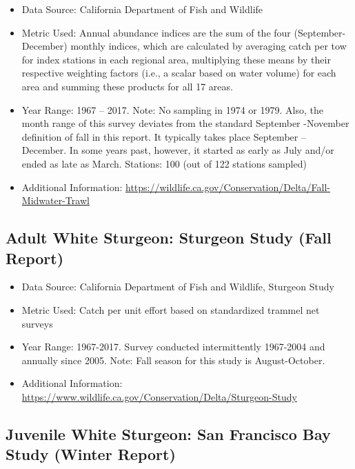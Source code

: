 \documentclass[
]{book}
\providecommand{\tightlist}{%
  \setlength{\itemsep}{0pt}\setlength{\parskip}{0pt}}
\begin{document}
\begin{itemize}
\tightlist
\item
  Data Source: California Department of Fish and Wildlife
\item
  Metric Used: Annual abundance indices are the sum of the four (September-December) monthly indices, which are calculated by averaging catch per tow for index stations in each regional area, multiplying these means by their respective weighting factors (i.e., a scalar based on water volume) for each area and summing these products for all 17 areas.
\item
  Year Range: 1967 -- 2017. Note: No sampling in 1974 or 1979. Also, the month range of this survey deviates from the standard September -November definition of fall in this report. It typically takes place September -- December. In some years past, however, it started as early as July and/or ended as late as March.
  Stations: 100 (out of 122 stations sampled)
\item
  Additional Information: \url{https://wildlife.ca.gov/Conservation/Delta/Fall-Midwater-Trawl}
\end{itemize}

\hypertarget{adult-white-sturgeon-sturgeon-study-fall-report}{%
\subsection{Adult White Sturgeon: Sturgeon Study (Fall Report)}\label{adult-white-sturgeon-sturgeon-study-fall-report}}

\begin{itemize}
\tightlist
\item
  Data Source: California Department of Fish and Wildlife, Sturgeon Study\\
\item
  Metric Used: Catch per unit effort based on standardized trammel net surveys
\item
  Year Range: 1967-2017. Survey conducted intermittently 1967-2004 and annually since 2005. Note: Fall season for this study is August-October.
\item
  Additional Information: \url{https://www.wildlife.ca.gov/Conservation/Delta/Sturgeon-Study}
\end{itemize}

\hypertarget{juvenile-white-sturgeon-san-francisco-bay-study-winter-report}{%
\subsection{Juvenile White Sturgeon: San Francisco Bay Study (Winter Report)}\label{juvenile-white-sturgeon-san-francisco-bay-study-winter-report}}
\end{document}
